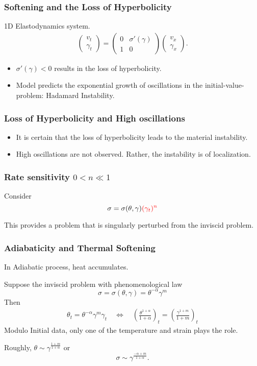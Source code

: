 \documentclass{beamer}
\def\red{\color{red}}
\def\blue{\color{blue}}
\begin{document}
\begin{frame}
 \frametitle{Softening and the Loss of Hyperbolicity}
 1D Elastodynamics system.
 \begin{align*}
  \begin{pmatrix}
   v_t\\ \gamma_t
  \end{pmatrix}
  = \begin{pmatrix}
   0 &\sigma'(\gamma)\\ 1 & 0
  \end{pmatrix} 
  \begin{pmatrix}
   v_x\\ \gamma_x
  \end{pmatrix}.
 \end{align*}
 \vfill
 \begin{itemize}
  \item $\sigma'(\gamma)<0$ results in the loss of hyperbolicity.
  \item Model predicts the exponential growth of oscillations in the initial-value-problem: {\blue Hadamard Instability}.
 \end{itemize}
\end{frame}



\begin{frame}
 \frametitle{Loss of Hyperbolicity and High oscillations}
 \begin{itemize}
  \item It is certain that the loss of hyperbolicity leads to the material instability.
  \item High oscillations are not observed. Rather, the instability is of localization.
 \end{itemize}
 \vfill
\end{frame}

\begin{frame}
 \frametitle{Rate sensitivity $0<n\ll1$}
 Consider
 $$\sigma=\sigma(\theta,\gamma){\red (\gamma_t)^n}$$
 
 This provides a problem that is singularly perturbed from the inviscid problem.
 \vfill
\end{frame}

\begin{frame}
 \frametitle{Adiabaticity and Thermal Softening}
  In Adiabatic process, heat accumulates.  
  
  Suppose the inviscid problem with phenomenological law
 $$\sigma=\sigma(\theta,\gamma)=\theta^{-\alpha}\gamma^m$$
 Then
 \begin{align*}
  \theta_t = \theta^{-\alpha}\gamma^m\gamma_t \quad \Longleftrightarrow \quad 
  \left(\frac{\theta^{1+\alpha}}{1+\alpha}\right)_t = \left(\frac{\gamma^{1+m}}{1+m}\right)_t
 \end{align*}
 Modulo Initial data, only one of the temperature and strain plays the role.
 
 Roughly, $\theta\sim \gamma^{\frac{1+m}{1+\alpha}}$ or
 $$\sigma \sim \gamma^{\frac{-\alpha+m}{1+\alpha}}.$$
 \vfill
\end{frame}
\end{document}
